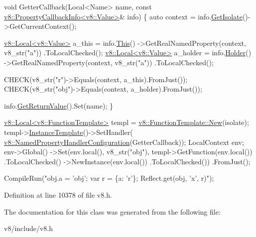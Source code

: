 \begin{DoxyCode}
\textcolor{keywordtype}{void} GetterCallback(Local<Name> name,
                    \textcolor{keyword}{const} \mbox{\hyperlink{classv8_1_1PropertyCallbackInfo}{v8::PropertyCallbackInfo<v8::Value>}}& info) \{
   \textcolor{keyword}{auto} context = info.\mbox{\hyperlink{classv8_1_1PropertyCallbackInfo_aff7b838ede308ab8a42890962eb9271c}{GetIsolate}}()->GetCurrentContext();

   \mbox{\hyperlink{classv8_1_1Local}{v8::Local<v8::Value>}} a\_this =
       info.\mbox{\hyperlink{classv8_1_1PropertyCallbackInfo_af46300339d2f31d8dc84a06d74ed6c3c}{This}}()
           ->GetRealNamedProperty(context, v8\_str(\textcolor{stringliteral}{"a"}))
           .ToLocalChecked();
   \mbox{\hyperlink{classv8_1_1Local}{v8::Local<v8::Value>}} a\_holder =
       info.\mbox{\hyperlink{classv8_1_1PropertyCallbackInfo_a66b7ec267f18bd84e8baf0a0e16187b9}{Holder}}()
           ->GetRealNamedProperty(context, v8\_str(\textcolor{stringliteral}{"a"}))
           .ToLocalChecked();

  CHECK(v8\_str(\textcolor{stringliteral}{"r"})->Equals(context, a\_this).FromJust());
  CHECK(v8\_str(\textcolor{stringliteral}{"obj"})->Equals(context, a\_holder).FromJust());

  info.\mbox{\hyperlink{classv8_1_1PropertyCallbackInfo_aa0882946929c3c4df6d131fe0d8d6746}{GetReturnValue}}().Set(name);
\}

\mbox{\hyperlink{classv8_1_1Local}{v8::Local<v8::FunctionTemplate>}} templ =
\mbox{\hyperlink{classv8_1_1FunctionTemplate_a3b675b8327f08a7c6a4c4d9dce5cb3b3}{v8::FunctionTemplate::New}}(isolate);
templ->\mbox{\hyperlink{classv8_1_1FunctionTemplate_a00dd9725566908e8fd14064542f5a781}{InstanceTemplate}}()->SetHandler(
    \mbox{\hyperlink{structv8_1_1NamedPropertyHandlerConfiguration}{v8::NamedPropertyHandlerConfiguration}}(GetterCallback));
LocalContext env;
env->Global()
    ->Set(env.local(), v8\_str(\textcolor{stringliteral}{"obj"}), templ->GetFunction(env.local())
                                         .ToLocalChecked()
                                         ->NewInstance(env.local())
                                         .ToLocalChecked())
    .FromJust();

CompileRun(\textcolor{stringliteral}{"obj.a = 'obj'; var r = \{a: 'r'\}; Reflect.get(obj, 'x', r)"});
\end{DoxyCode}
 

Definition at line 10378 of file v8.\+h.



The documentation for this class was generated from the following file\+:\begin{DoxyCompactItemize}
\item 
v8/include/v8.\+h\end{DoxyCompactItemize}
